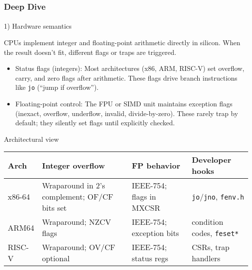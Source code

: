 \documentclass[
  letterpaper,
  DIV=11,
  numbers=noendperiod]{scrreprt}
\makeatletter
\let\oldparagraph\paragraph
\renewcommand{\paragraph}{
    \@ifstar
      \xxxParagraphStar
      \xxxParagraphNoStar
  }
\newcommand{\xxxParagraphStar}[1]{\oldparagraph*{#1}\mbox{}}
\newcommand{\xxxParagraphNoStar}[1]{\oldparagraph{#1}\mbox{}}
\providecommand{\tightlist}{%
  \setlength{\itemsep}{0pt}\setlength{\parskip}{0pt}}
\makeatother
\begin{document}
\subsubsection{Deep Dive}\label{deep-dive-2}

\paragraph{1) Hardware semantics}\label{hardware-semantics}

CPUs implement integer and floating-point arithmetic directly in
silicon. When the result doesn't fit, different flags or traps are
triggered.

\begin{itemize}
\tightlist
\item
  Status flags (integers): Most architectures (x86, ARM, RISC-V) set
  overflow, carry, and zero flags after arithmetic. These flags drive
  branch instructions like \texttt{jo} (``jump if overflow'').
\item
  Floating-point control: The FPU or SIMD unit maintains exception flags
  (inexact, overflow, underflow, invalid, divide-by-zero). These rarely
  trap by default; they silently set flags until explicitly checked.
\end{itemize}

Architectural view

\begin{longtable}[]{@{}
  >{\raggedright\arraybackslash}p{}
  >{\raggedright\arraybackslash}p{}
  >{\raggedright\arraybackslash}p{}
  >{\raggedright\arraybackslash}p{}@{}}
\toprule\noalign{}
\begin{minipage}[b]{\linewidth}\raggedright
Arch
\end{minipage} & \begin{minipage}[b]{\linewidth}\raggedright
Integer overflow
\end{minipage} & \begin{minipage}[b]{\linewidth}\raggedright
FP behavior
\end{minipage} & \begin{minipage}[b]{\linewidth}\raggedright
Developer hooks
\end{minipage} \\
\midrule\noalign{}
\endhead
\bottomrule\noalign{}
\endlastfoot
x86-64 & Wraparound in 2's complement; OF/CF bits set & IEEE-754; flags
in MXCSR & \texttt{jo}/\texttt{jno}, \texttt{fenv.h} \\
ARM64 & Wraparound; NZCV flags & IEEE-754; exception bits & condition
codes, \texttt{feset*} \\
RISC-V & Wraparound; OV/CF optional & IEEE-754; status regs & CSRs, trap
handlers \\
\end{longtable}
\end{document}
